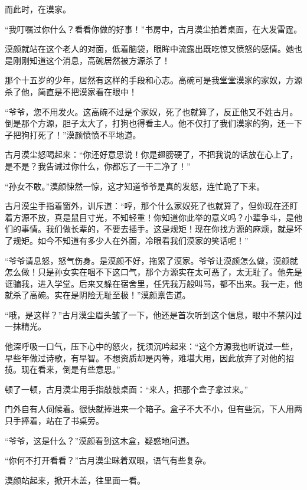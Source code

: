 
\begin{this_body}

而此时，在漠家。

“我叮嘱过你什么？看看你做的好事！”书房中，古月漠尘拍着桌面，在大发雷霆。

漠颜就站在这个老人的对面，低着脑袋，眼眸中流露出既吃惊又愤怒的感情。她也是刚刚知道这个消息，高碗居然被方源杀了！

那个十五岁的少年，居然有这样的手段和心志。高碗可是我堂堂漠家的家奴，方源杀了他，简直是不把漠家看在眼中！

“爷爷，您不用发火。这高碗不过是个家奴，死了也就算了，反正他又不姓古月。倒是那个方源，胆子太大了，打狗也得看主人。他不仅打了我们漠家的狗，还一下子把狗打死了！”漠颜愤愤不平地道。

古月漠尘怒喝起来：“你还好意思说！你是翅膀硬了，不把我说的话放在心上了，是不是？我告诫过你什么，你都忘了一干二净了！”

“孙女不敢。”漠颜悚然一惊，这才知道爷爷是真的发怒，连忙跪了下来。

古月漠尘手指着窗外，训斥道：“哼，那个什么家奴死了也就算了，但你现在还盯着方源不放，真是鼠目寸光，不知轻重！你知道你此举的意义吗？小辈争斗，是他们的事情。我们做长辈的，不要去插手。这是规矩！现在你找方源的麻烦，就是坏了规矩。如今不知道有多少人在外面，冷眼看我们漠家的笑话呢！”

“爷爷请息怒，怒气伤身。是漠颜不好，拖累了漠家。爷爷让漠颜怎么做，漠颜就怎么做！只是孙女实在咽不下这口气，那个方源实在太可恶了，太无耻了。他先是诓骗我，进入学堂。后来又躲在宿舍里，任凭我万般叫骂，都不出来。我一走，他就杀了高碗。实在是阴险无耻至极！”漠颜禀告道。

“哦，是这样？”古月漠尘眉头皱了一下，他还是首次听到这个信息，眼中不禁闪过一抹精光。

他深呼吸一口气，压下心中的怒火，抚须沉吟起来：“这个方源我也听说过一些，早些年做过诗歌，有早智。不想资质却是丙等，难堪大用，因此放弃了对他的招揽。现在看来，倒是有些意思。”

顿了一顿，古月漠尘用手指敲敲桌面：“来人，把那个盒子拿过来。”

门外自有人伺候着。很快就捧进来一个箱子。盒子不大不小，但有些沉，下人用两只手捧着，站在了书桌旁。

“爷爷，这是什么？”漠颜看到这木盒，疑惑地问道。

“你何不打开看看？”古月漠尘眯着双眼，语气有些复杂。

漠颜站起来，掀开木盖，往里面一看。


\end{this_body}
